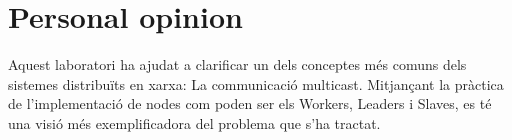 \documentclass[a4paper, 10pt]{article}
\begin{document}
\newpage\section{Personal opinion}
    Aquest laboratori ha ajudat a clarificar un dels conceptes més comuns dels sistemes distribuïts en xarxa: La communicació multicast. Mitjançant la pràctica de l'implementació de nodes com poden ser els Workers, Leaders i Slaves, es té una visió més exemplificadora del problema que s'ha tractat.
\end{document}
